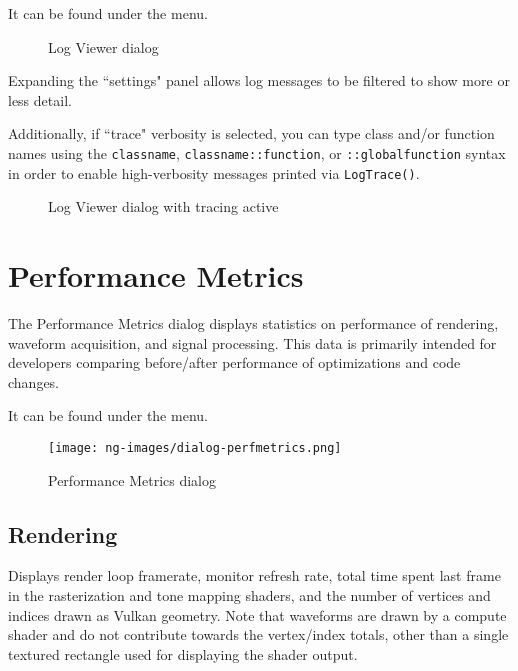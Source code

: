 It can be found under the  menu.

\begin{figure}[H]
\centering
{}
\caption{Log Viewer dialog}
\label{fig:logviewer}
\end{figure}

Expanding the ``settings" panel allows log messages to be filtered to show more or less detail.

Additionally, if ``trace" verbosity is selected, you can type class and/or function names using the \texttt{classname},
\texttt{classname::function}, or \texttt{::globalfunction} syntax in order to enable high-verbosity messages printed
via \texttt{LogTrace()}.

\begin{figure}[H]
\centering
{}
\caption{Log Viewer dialog with tracing active}
\label{fig:logviewer-trace}
\end{figure}


\section{Performance Metrics}
\label{dlg:perfmetrics}

The Performance Metrics dialog displays statistics on performance of rendering, waveform acquisition, and signal
processing. This data is primarily intended for developers comparing before/after performance of optimizations and code
changes.

It can be found under the  menu.

\begin{figure}[H]
\centering
\texttt{[image: ng-images/dialog-perfmetrics.png]}
\caption{Performance Metrics dialog}
\label{fig:perfmetrics}
\end{figure}

\subsection{Rendering}

Displays render loop framerate, monitor refresh rate, total time spent last frame in the rasterization and tone
mapping shaders, and the number of vertices and indices drawn as Vulkan geometry. Note that waveforms are drawn by a
compute shader and do not contribute towards the vertex/index totals, other than a single textured rectangle used for
displaying the shader output.

